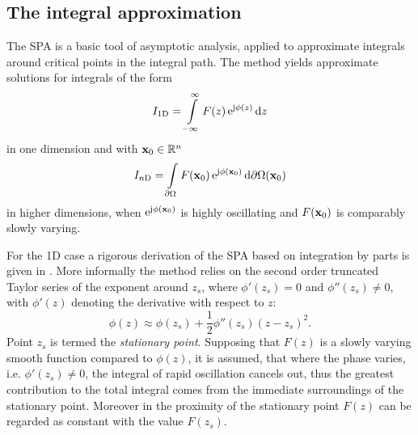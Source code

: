 \subsection{The integral approximation}
%
The SPA is a basic tool of asymptotic analysis, applied to approximate integrals around critical points in the integral path.
The method yields approximate solutions for integrals of the form
\begin{equation}
\label{Eq:SPAintegral_1d}
I_{1\mathrm{D}} = \int\limits_{-\infty}^{\infty} F(z) \, \mathrm{e}^{\mathrm{j} \phi(z)} \, \mathrm{d} z
\end{equation}
in one dimension and with $\mathbf{x}_0 \in \mathbb{R}^{n}$
\begin{equation}
\label{Eq:SPAintegral_nd}
I_{n\mathrm{D}} = \int\limits_{\partial \Omega} F(\mathbf{x}_0) \, \mathrm{e}^{\mathrm{j} \phi(\mathbf{x}_0)} \, \mathrm{d} \partial \Omega(\mathbf{x}_0)
\end{equation}
in higher dimensions, when $\mathrm{e}^{\mathrm{j} \phi(\mathbf{x}_0)}$ is highly oscillating and $F(\mathbf{x}_0)$ is comparably slowly varying. 

For the 1D case a rigorous derivation of the SPA based on integration by parts is given in \cite{Bleistein1984, Blenstein1975, Williams1999}. More informally the method relies on the second order truncated Taylor series of the exponent around $z_s$, where $\phi'(z_s) = 0$ and $\phi''(z_s) \neq 0$, with $\phi'(z)$ denoting the derivative with respect to $z$:
\begin{equation}
\phi(z) \approx \phi(z_s) + \frac{1}{2}\phi''(z_s)(z-z_s)^2.
\end{equation}
Point $z_s$ is termed the \emph{stationary point}. 
Supposing that $F(z)$ is a slowly varying smooth function compared to $\phi(z)$, it is assumed, that where the phase varies, i.e. $\phi'(z_s) \neq 0$, the integral of rapid oscillation cancels out, thus the greatest contribution to the total integral comes from the immediate surroundings of the stationary point. Moreover in the proximity of the stationary point $F(z)$ can be regarded as constant with the value $F(z_s)$.

